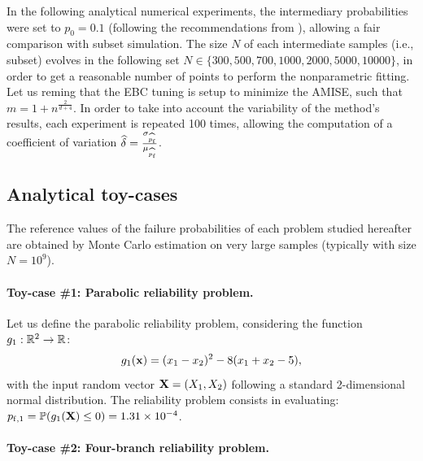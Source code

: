 In the following analytical numerical experiments, the intermediary probabilities were set to $p_0=0.1$ (following the recommendations from \citet{AuBeck2001}), allowing a fair comparison with subset simulation. 
The size $N$ of each intermediate samples (i.e., subset) evolves in the following set $N\in \{300, 500, 700, 1000, 2000, 5000, 10 000\}$, in order to get a reasonable number of points to perform the nonparametric fitting. 
Let us reming that the EBC tuning is setup to minimize the AMISE, such that $m = 1 + n^{\frac{2}{d+4}}$. 
In order to take into account the variability of the method's results, each experiment is repeated 100 times, allowing the computation of a coefficient of variation $\widehat{\delta} = \frac{\sigma_{\widehat{p_\mathrm{f}}}}{\mu_{\widehat{p_\mathrm{f}}}}$. 

\subsection{Analytical toy-cases}
The reference values of the failure probabilities of each problem studied hereafter are obtained by Monte Carlo estimation on very large samples (typically with size $N = 10^9$). 

\paragraph{Toy-case \#1: Parabolic reliability problem.}

Let us define the parabolic reliability problem, considering the function $g_1: \mathbb{R}^2 \rightarrow \mathbb{R}$:
\begin{equation}
    g_1({\bf x})= (x_1 - x_2) ^ 2 - 8 (x_1 + x_2 - 5),
\end{equation}
with the input random vector ${\bf X} = (X_1, X_2)$ following a standard 2-dimensional normal distribution. 
The reliability problem consists in evaluating: $p_{\mathrm{f}, 1} = \mathbb{P} ( g_1({\bf X}) \leq 0 ) = 1.31 \times 10^{-4}$.

\paragraph{Toy-case \#2: Four-branch reliability problem.}

